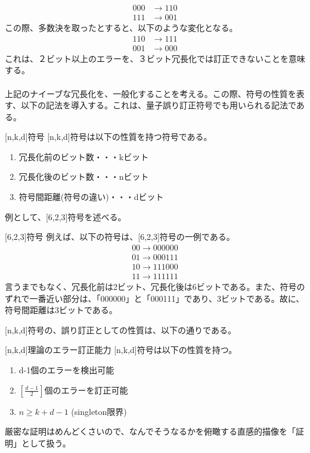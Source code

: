 \documentclass[a4paper,10.5pt]{article}
\numberwithin{equation}{section}
\begin{document}
\begin{align*}
    000&\to110\\
    111&\to001
\end{align*}
この際、多数決を取ったとすると、以下のような変化となる。
\begin{align*}
    110&\to 111\\
    001&\to 000
\end{align*}
これは、２ビット以上のエラーを、３ビット冗長化では訂正できないことを意味する。\\
\\
上記のナイーブな冗長化を、一般化することを考える。この際、符号の性質を表す、以下の記法を導入する。これは、量子誤り訂正符号でも用いられる記法である。
\begin{defbox}{[n,k,d]符号}
[n,k,d]符号は以下の性質を持つ符号である。
\begin{enumerate}
    \item 冗長化前のビット数・・・kビット
    \item 冗長化後のビット数・・・nビット
    \item 符号間距離(符号の違い)・・・dビット
\end{enumerate}
\end{defbox}
例として、[6,2,3]符号を述べる。
\begin{examplebox}{[6,2,3]符号}
例えば、以下の符号は、[6,2,3]符号の一例である。
\begin{align*}
    00\to 000000\\
    01\to 000111\\
    10\to 111000\\
    11\to 111111
\end{align*}
言うまでもなく、冗長化前は2ビット、冗長化後は6ビットである。また、符号のずれで一番近い部分は、「000000」と「000111」であり、3ビットである。故に、符号間距離は3ビットである。
\end{examplebox}
[n,k,d]符号の、誤り訂正としての性質は、以下の通りである。
\begin{theorembox}{[n,k,d]理論のエラー訂正能力}
[n,k,d]符号は以下の性質を持つ。
\begin{enumerate}
    \item d-1個のエラーを検出可能
    \item $[\frac{d-1}{2}]$個のエラーを訂正可能
    \item $n\geq k+d-1$ (singleton限界)
\end{enumerate}
\end{theorembox}
厳密な証明はめんどくさいので、なんでそうなるかを俯瞰する直感的描像を「証明」として扱う。
\end{document}
